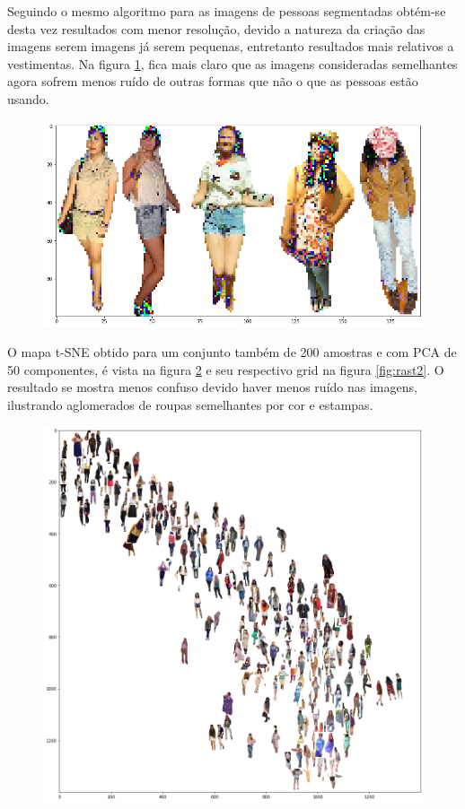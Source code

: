 \documentclass[12pt]{report}
\begin{document}
Seguindo o mesmo algoritmo para as imagens de pessoas segmentadas obtém-se desta vez resultados com menor resolução, devido a natureza da criação das imagens serem imagens já serem pequenas, entretanto resultados mais relativos a vestimentas. Na figura \ref{fig:compasegs}, fica mais claro que as imagens consideradas semelhantes agora sofrem menos ruído de outras formas que não o que as pessoas estão usando. 

\begin{figure}
    \centering
    \includegraphics[scale=0.4]{images/resultados/compasegs.png}
    \caption{}
    \label{fig:compasegs}
\end{figure}

O mapa t-SNE obtido para um conjunto também de 200 amostras e com PCA de 50 componentes, é vista na figura \ref{fig:tsne3} e seu respectivo grid na figura \ref{fig:rast2}. O resultado se mostra menos confuso devido haver menos ruído nas imagens, ilustrando aglomerados de roupas semelhantes por cor e estampas. 

\begin{figure}
    \centering
    \includegraphics[scale=0.5]{images/resultados/tsne3.png}
    \caption{}
    \label{fig:tsne3}
\end{figure}
\end{document}
